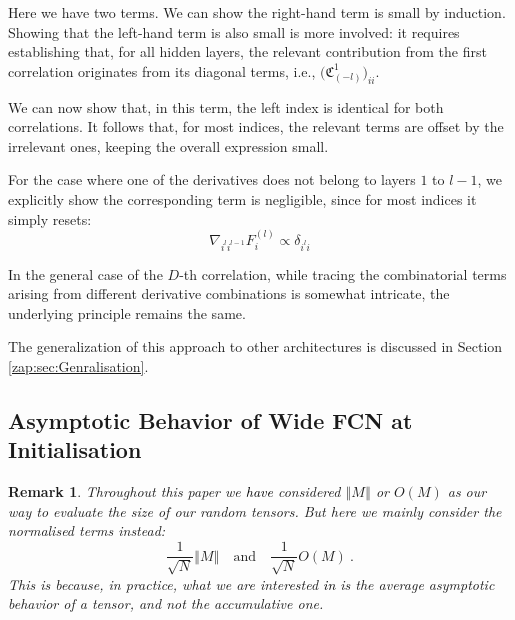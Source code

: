 \documentclass{article} %
\newtheorem{remark}{Remark}
[section]
\begin{document}
Here we have two terms.
We can show the right-hand term is small by induction.
Showing that the left-hand term is also small is more involved: it requires establishing that, for all hidden layers, the relevant contribution from the first correlation originates from its diagonal terms, i.e., \(\bigl(\mathfrak{C}_{(-l)}^{1}\bigr)_{ii}\).

We can now show that, in this term, the left index is identical for both correlations.
It follows that, for most indices, the relevant terms are offset by the irrelevant ones, keeping the overall expression small.

For the case where one of the derivatives does not belong to layers \(1\) to \(l-1\), we explicitly show the corresponding term is negligible, since for most indices it simply resets:
\begin{equation}
\nabla_{i^{l}i^{l-1}}F_{i}^{\left(l\right)}\propto\delta_{i^{l}i}
\end{equation}

In the general case of the \(D\)-th correlation, while tracing the combinatorial terms arising from different derivative combinations is somewhat intricate, the underlying principle remains the same.

The generalization of this approach to other architectures is discussed in Section \ref{zap:sec:Genralisation}.


\subsection{Asymptotic Behavior of Wide FCN at Initialisation}
\label{sec:WideNNAreLowCorParIn}

\begin{remark}
\textup
{Throughout this paper we \textcolor{black}{have} considered \(\left\Vert M\right\Vert \) or \(O(M)\) as our way to evaluate the size of our random tensors. But here we mainly consider the normalised terms instead:
\begin{equation}
\frac{1}{\sqrt{N}}\left\Vert M\right\Vert \quad\text{and}\quad \frac{1}{\sqrt{N}}O\left(M\right)  \ .
\end{equation}
This is because, in practice, what we are interested \textcolor{black}{in} is the average asymptotic behavior of a tensor, and not the accumulative one.
}
\end{remark}
\end{document}

